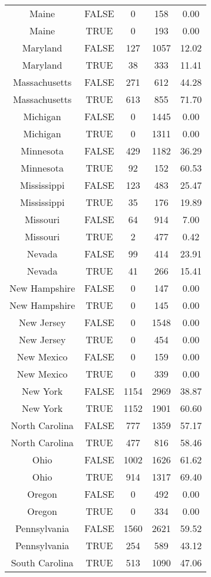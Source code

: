 \documentclass[
]{article}
\begin{document}
\begin{longtable}[t]{ccccc}
Maine & FALSE & 0 & 158 & 0.00\\
Maine & TRUE & 0 & 193 & 0.00\\
Maryland & FALSE & 127 & 1057 & 12.02\\
Maryland & TRUE & 38 & 333 & 11.41\\
\addlinespace
Massachusetts & FALSE & 271 & 612 & 44.28\\
Massachusetts & TRUE & 613 & 855 & 71.70\\
Michigan & FALSE & 0 & 1445 & 0.00\\
Michigan & TRUE & 0 & 1311 & 0.00\\
Minnesota & FALSE & 429 & 1182 & 36.29\\
\addlinespace
Minnesota & TRUE & 92 & 152 & 60.53\\
Mississippi & FALSE & 123 & 483 & 25.47\\
Mississippi & TRUE & 35 & 176 & 19.89\\
Missouri & FALSE & 64 & 914 & 7.00\\
Missouri & TRUE & 2 & 477 & 0.42\\
\addlinespace
Nevada & FALSE & 99 & 414 & 23.91\\
Nevada & TRUE & 41 & 266 & 15.41\\
New Hampshire & FALSE & 0 & 147 & 0.00\\
New Hampshire & TRUE & 0 & 145 & 0.00\\
New Jersey & FALSE & 0 & 1548 & 0.00\\
\addlinespace
New Jersey & TRUE & 0 & 454 & 0.00\\
New Mexico & FALSE & 0 & 159 & 0.00\\
New Mexico & TRUE & 0 & 339 & 0.00\\
New York & FALSE & 1154 & 2969 & 38.87\\
New York & TRUE & 1152 & 1901 & 60.60\\
\addlinespace
North Carolina & FALSE & 777 & 1359 & 57.17\\
North Carolina & TRUE & 477 & 816 & 58.46\\
Ohio & FALSE & 1002 & 1626 & 61.62\\
Ohio & TRUE & 914 & 1317 & 69.40\\
Oregon & FALSE & 0 & 492 & 0.00\\
\addlinespace
Oregon & TRUE & 0 & 334 & 0.00\\
Pennsylvania & FALSE & 1560 & 2621 & 59.52\\
Pennsylvania & TRUE & 254 & 589 & 43.12\\
South Carolina & TRUE & 513 & 1090 & 47.06\\

\end{longtable}
\end{document}
